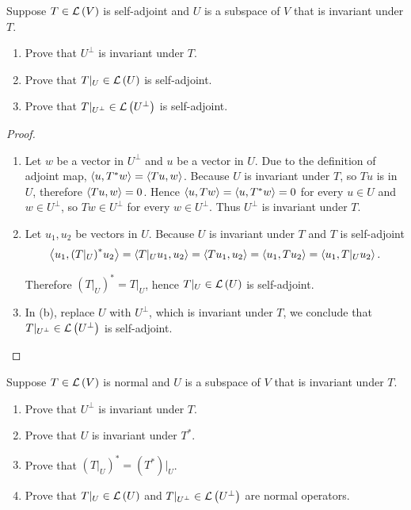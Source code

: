 \begin{exercise}\label{chapter7:sectionB:exercise19}
    Suppose $T \in \mathcal{L}\left({V}\right)$ is self-adjoint and $U$ is a subspace of $V$ that is invariant under $T$.
    \begin{enumerate}[label={(\alph*)}]
        \item Prove that $U^{\bot}$ is invariant under $T$.
        \item Prove that $T\vert_{U}\in \mathcal{L}\left({U}\right)$ is self-adjoint.
        \item Prove that $T\vert_{U^{\bot}}\in \mathcal{L}\left({U^{\bot}}\right)$ is self-adjoint.
    \end{enumerate}
\end{exercise}

\begin{proof}
    \begin{enumerate}[label={(\alph*)}]
        \item Let $w$ be a vector in $U^{\bot}$ and $u$ be a vector in $U$. Due to the definition of adjoint map, $\left\langle{u, T^{*}w}\right\rangle = \left\langle{Tu, w}\right\rangle$. Because $U$ is invariant under $T$, so $Tu$ is in $U$, therefore $\left\langle{Tu, w}\right\rangle = 0$. Hence $\left\langle{u, Tw}\right\rangle = \left\langle{u, T^{*}w}\right\rangle = 0$ for every $u\in U$ and $w\in U^{\bot}$, so $Tw\in U^{\bot}$ for every $w\in U^{\bot}$. Thus $U^{\bot}$ is invariant under $T$.
        \item Let $u_{1}, u_{2}$ be vectors in $U$. Because $U$ is invariant under $T$ and $T$ is self-adjoint
              \[
                  \left\langle{u_{1}, {(T\vert_{U})}^{*}u_{2}}\right\rangle = \left\langle{T\vert_{U}u_{1}, u_{2}}\right\rangle = \left\langle{Tu_{1}, u_{2}}\right\rangle = \left\langle{u_{1}, Tu_{2}}\right\rangle = \left\langle{u_{1}, T\vert_{U}u_{2}}\right\rangle.
              \]

              Therefore ${(T\vert_{U})}^{*} = T\vert_{U}$, hence $T\vert_{U}\in\mathcal{L}\left({U}\right)$ is self-adjoint.
        \item In (b), replace $U$ with $U^{\bot}$, which is invariant under $T$, we conclude that $T\vert_{U^{\bot}}\in \mathcal{L}\left({U^{\bot}}\right)$ is self-adjoint.
    \end{enumerate}
\end{proof}
\newpage

\begin{exercise}
    Suppose $T \in \mathcal{L}\left({V}\right)$ is normal and $U$ is a subspace of $V$ that is invariant under $T$.
    \begin{enumerate}[label={(\alph*)}]
        \item Prove that $U^{\bot}$ is invariant under $T$.
        \item Prove that $U$ is invariant under $T^{*}$.
        \item Prove that ${(T\vert_{U})}^{*} = {(T^{*})\vert_{U}}$.
        \item Prove that $T\vert_{U}\in \mathcal{L}\left({U}\right)$ and $T\vert_{U^{\bot}}\in \mathcal{L}\left({U^{\bot}}\right)$ are normal operators.
    \end{enumerate}
\end{exercise}

